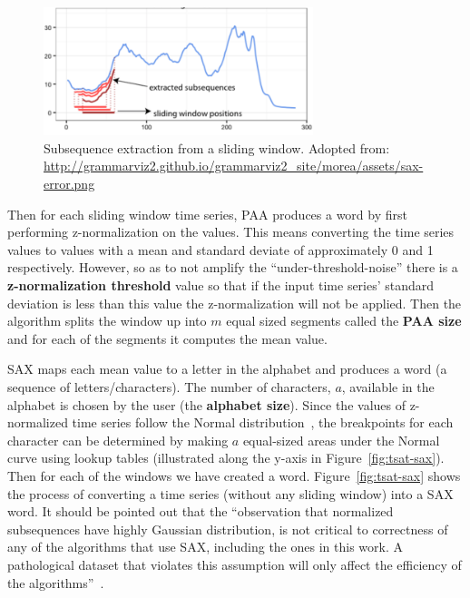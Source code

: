 \documentclass[letterpaper, 12pt]{article}
\begin{document}
\begin{figure}[H]
	\centering
	\includegraphics[width=0.7\textwidth]{pictures/TSAT-slidingwindow}
	\caption{Subsequence extraction from a sliding window.  Adopted from:\\ \url{http://grammarviz2.github.io/grammarviz2_site/morea/assets/sax-error.png}}
	\label{fig:tsat-slidingwindow}
\end{figure}


Then for each sliding window time series, PAA produces a word by first performing z-normalization on the values.  This means converting the time series values to values with a mean and standard deviate of approximately 0 and 1 respectively.  However, so as to not amplify the ``under-threshold-noise'' there is a \textbf{z-normalization threshold} value so that if the input time series' standard deviation is less than this value the z-normalization will not be applied. Then the algorithm splits the window up into \(m\) equal sized segments called the \textbf{PAA size} and for each of the segments it computes the mean value.  

SAX maps each mean value to a letter in the alphabet and produces a word (a sequence of letters/characters).  The number of characters, \(a\), available in the alphabet is chosen by the user (the \textbf{alphabet size}).  Since the values of z-normalized time series follow the Normal distribution~\cite{lin2003symbolic}, the breakpoints for each character can be determined by making \(a\) equal-sized areas under the Normal curve using lookup tables (illustrated along the y-axis in Figure~\ref{fig:tsat-sax}). Then for each of the windows we have created a word.  Figure~\ref{fig:tsat-sax} shows the process of converting a time series (without any sliding window) into a SAX word.  It should be pointed out that the ``observation that normalized subsequences have highly Gaussian distribution, is not critical to correctness of any of the algorithms that use SAX, including the ones in this work. A pathological dataset that violates this assumption will only affect the efficiency of the algorithms''~\cite{keogh2004hot}.
\end{document}
